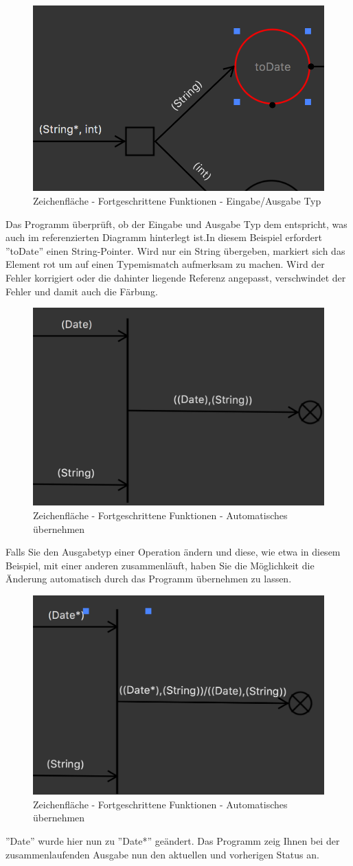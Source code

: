 \pagebreak
\begin{figure}[H]
	\centering
	\includegraphics[width=.6\textwidth]{Advanced3.png}
	\caption{Zeichenfläche - Fortgeschrittene Funktionen - Eingabe/Ausgabe Typ}
\end{figure}

Das Programm überprüft, ob der Eingabe und Ausgabe Typ dem entspricht, was auch im referenzierten Diagramm hinterlegt ist.In diesem Beispiel erfordert ''toDate'' einen String-Pointer. Wird nur ein String übergeben, markiert sich das Element rot um auf einen Typemismatch aufmerksam zu machen. Wird der Fehler korrigiert oder die dahinter liegende Referenz angepasst, verschwindet der Fehler und damit auch die Färbung.

\begin{figure}[H]
	\centering
	\includegraphics[width=.6\textwidth]{Quelle.png}
	\caption{Zeichenfläche - Fortgeschrittene Funktionen - Automatisches übernehmen}
\end{figure}
Falls Sie den Ausgabetyp einer Operation ändern und diese, wie etwa in diesem Beispiel, mit einer anderen zusammenläuft, haben Sie die Möglichkeit die Änderung automatisch durch das Programm übernehmen zu lassen. 

\begin{figure}[H]
	\centering
	\includegraphics[width=.6\textwidth]{Quelle2.png}
	\caption{Zeichenfläche - Fortgeschrittene Funktionen - Automatisches übernehmen}
\end{figure}
''Date'' wurde hier nun zu ''Date*'' geändert. Das Programm zeig Ihnen bei der zusammenlaufenden Ausgabe nun den aktuellen und vorherigen Status an. 

